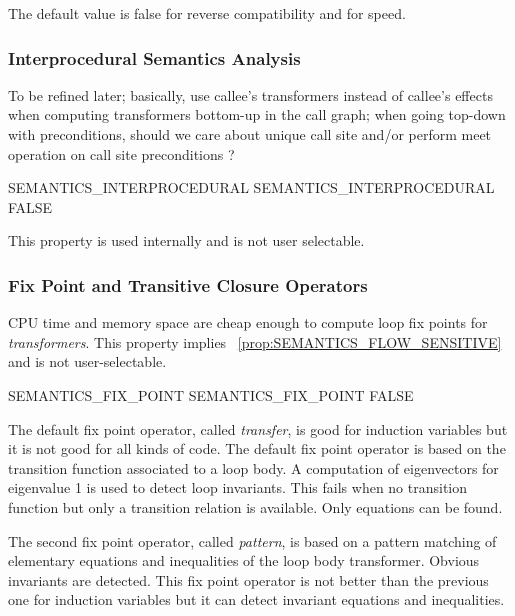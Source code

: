 \documentclass[a4paper]{report}
\newcommand{\PipsPropRef}[1]{\texttt{\detokenize{#1}}~\ref{prop:#1}}
\begin{document}
The default value is false for reverse compatibility and for speed.

\subsubsection{Interprocedural Semantics Analysis}

To be refined later; basically, use callee's transformers instead of
callee's effects when computing transformers bottom-up in the call graph;
when going top-down with preconditions, should we care about unique
call site and/or perform meet operation on call site preconditions ?

\begin{PipsProp}{SEMANTICS_INTERPROCEDURAL}
SEMANTICS_INTERPROCEDURAL FALSE
\end{PipsProp}

This property is used internally and is not user selectable.

\subsubsection{Fix Point and Transitive Closure Operators}

CPU time and memory space are cheap enough to compute loop fix points
for {\em transformers}. This property implies
\PipsPropRef{SEMANTICS_FLOW_SENSITIVE} and is not user-selectable.

\begin{PipsProp}{SEMANTICS_FIX_POINT}
SEMANTICS_FIX_POINT FALSE
\end{PipsProp}

The default fix point operator, called {\em transfer}, is good for
induction variables but it is not good for all kinds of code. The default
fix point operator is based on the transition function associated to a
loop body. A computation of eigenvectors for eigenvalue 1 is used to
detect loop invariants. This fails when no transition function but only a
transition relation is available. Only equations can be found.

The second fix point operator, called {\em pattern}, is based on a pattern
matching of elementary equations and inequalities of the loop body
transformer. Obvious invariants are detected. This fix point operator is
not better than the previous one for induction variables but it can detect
invariant equations and inequalities.
\end{document}
